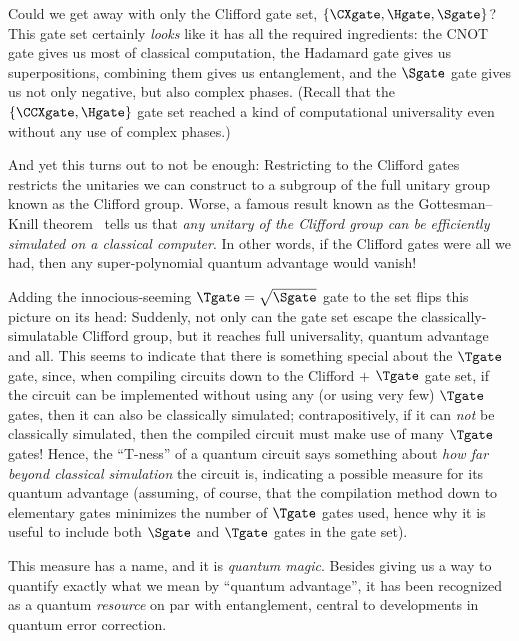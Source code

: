       Could we get away with only the Clifford gate set, 
        $\{\CXgate, \Hgate, \Sgate\}$? This gate set certainly \emph{looks} like
        it has all the required ingredients: the CNOT gate gives us most of
        classical computation, the Hadamard gate gives us superpositions, 
        combining them gives us entanglement, and the $\Sgate$ gate gives us
        not only negative, but also complex phases. (Recall that the
        $\{\CCXgate, \Hgate\}$ gate set reached a kind of computational 
        universality even without any use of complex phases.)

      And yet this turns out to not be enough: Restricting to the Clifford gates
        restricts the unitaries we can construct to a subgroup of the full unitary
        group known as the Clifford group. Worse, a famous result known as the
        Gottesman--Knill theorem~\cite{Gottesman98}
        tells us that \emph{any unitary of the Clifford group can be efficiently
        simulated on a classical computer}. In other words, if the Clifford
        gates were all we had, then any super-polynomial quantum advantage would
        vanish!

      Adding the innocious-seeming $\Tgate = \sqrt{\Sgate}$ gate to the set
        flips this picture on its head:
        Suddenly, not only can the gate set escape the classically-simulatable Clifford
        group, but it reaches full universality, quantum advantage and all.
        This seems to indicate that there is something special about the
        $\Tgate$ gate, since, when compiling circuits down to the Clifford $+$
        $\Tgate$ gate set, if the circuit can be implemented without using any
        (or using very few)
        $\Tgate$ gates, then it can also be classically simulated;
        contrapositively, if it can \emph{not} be classically simulated, then
        the compiled circuit must make use of many $\Tgate$ gates!
        Hence, the ``T-ness'' of a quantum circuit says something about
        \emph{how far beyond classical simulation} the circuit is, indicating a
        possible measure for its quantum advantage (assuming, of course, that
        the compilation method down to elementary gates minimizes the number of
        $\Tgate$ gates used, hence why it is useful to include both $\Sgate$ and
        $\Tgate$ gates in the gate set).

      This measure has a name, and it is \emph{quantum magic}. Besides
        giving us a way to quantify exactly what we mean by ``quantum
        advantage'', it has been recognized as a quantum \emph{resource} on par
        with entanglement, central to developments in quantum error correction.

